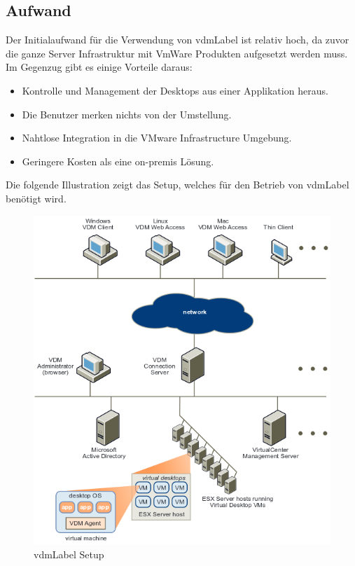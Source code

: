 \subsection{Aufwand}
Der Initialaufwand für die Verwendung von \Gls{vdmLabel} ist relativ hoch, da zuvor die ganze Server Infrastruktur mit VmWare Produkten aufgesetzt werden muss.
Im Gegenzug gibt es einige Vorteile daraus:
\begin{itemize}
	\item Kontrolle und Management der Desktops aus einer Applikation heraus.
	\item Die Benutzer merken nichts von der Umstellung.
	\item Nahtlose Integration in die VMware Infrastructure Umgebung.
	\item Geringere Kosten als eine on-premis Lösung.
\end{itemize}

Die folgende Illustration zeigt das Setup, welches für den Betrieb von \Gls{vdmLabel} benötigt wird.

\begin{figure}[H]
	\includegraphics[width=\textwidth]{images/vmware-vdm-setup}
	\caption{\Gls{vdmLabel} Setup}
	\label{fig:vdmSetup}
\end{figure}

